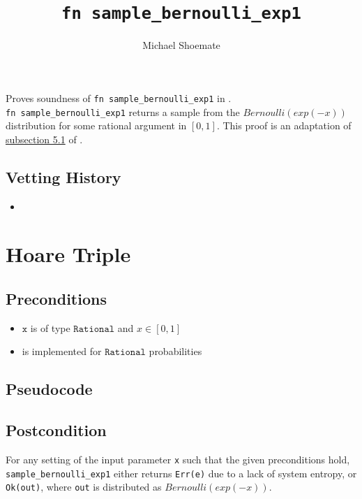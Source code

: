 \documentclass{article}
\title{\texttt{fn sample\_bernoulli\_exp1}}
\author{Michael Shoemate}
\begin{document}
\maketitle

\contrib
Proves soundness of \texttt{fn sample\_bernoulli\_exp1} in .\\
\texttt{fn sample\_bernoulli\_exp1} returns a sample from the $Bernoulli(exp(-x))$ distribution for some rational argument in $[0, 1]$.
This proof is an adaptation of \href{https://arxiv.org/pdf/2004.00010.pdf#subsection.5.1}{subsection 5.1} of \cite{CKS20}.

\subsection*{Vetting History}
\begin{itemize}
    \item {}
\end{itemize}

\section{Hoare Triple}
\subsection*{Preconditions}
\begin{itemize}
    \item $\texttt{x}$ is of type $\texttt{Rational}$ and $x \in [0, 1]$
    \item {} is implemented for $\texttt{Rational}$ probabilities
\end{itemize}


\subsection*{Pseudocode}        


\subsection*{Postcondition}
\label{postcondition}
For any setting of the input parameter \texttt{x} such that the given preconditions hold, \\
\texttt{sample\_bernoulli\_exp1} either returns \texttt{Err(e)} due to a lack of system entropy,
or \texttt{Ok(out)}, where \texttt{out} is distributed as $Bernoulli(exp(-x))$.
\end{document}
